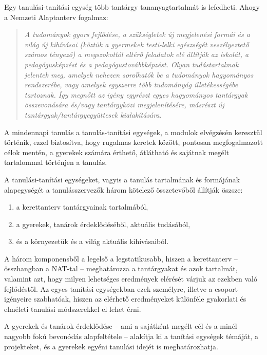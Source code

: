 Egy tanulási-tanítási egység több tantárgy tananyagtartalmát is lefedheti. Ahogy a Nemzeti Alaptanterv fogalmaz:
\begin{quote}
      \textit{A tudományok gyors fejlődése, a szükségletek új megjelenési formái és a világ új kihívásai (köztük a gyermekek testi-lelki egészségét veszélyeztető számos tényező) a megszokottól eltérő feladatok elé állítják az iskolát, a pedagógusképzést és a pedagógustovábbképzést. Olyan tudástartalmak jelentek meg, amelyek nehezen sorolhatók be a tudományok hagyományos rendszerébe, vagy amelyek egyszerre több tudományág illetékességébe tartoznak. Így megnőtt az igény egyrészt egyes hagyományos tantárgyak összevonására és/vagy tantárgyközi megjelenítésére, másrészt új tantárgyak/tantárgyegyüttesek kialakítására.}
\end{quote}

A mindennapi tanulás a tanulás-tanítási egységek, a modulok elvégzésén keresztül történik, ezzel biztosítva, hogy rugalmas keretek között, pontosan megfogalmazott célok mentén, a gyerekek számára érthető, átlátható és sajátnak megélt tartalommal történjen a tanulás.

A tanulási-tanítási egységeket, vagyis a tanulás tartalmának és formájának alapegységét a tanulásszervezők három kötelező összetevőből állítják ösz\-sze:

\begin{enumerate}
      \item
            a kerettanterv tantárgyainak tartalmából,
      \item
            a gyerekek, tanárok érdeklődéséből, aktuális tudásából,
      \item
            és a környezetük és a világ aktuális kihívásaiból.
\end{enumerate}

A három komponensből a legelső a legstatikusabb, hiszen a kerettanterv -- összhangban a NAT-tal -- meghatározza a tantárgyakat és azok tartalmát, valamint azt, hogy milyen lehetséges eredmények elérését várjuk az ezekben való fejlődéstől. Az egyes tanítási egységekban ezek személyre, illetve a csoport igényeire szabhatóak, hiszen az elérhető eredményeket különféle gyakorlati és elméleti tanulási módszerekkel el lehet érni.

A gyerekek és tanárok érdeklődése -- ami a sajátként megélt cél és a minél nagyobb fokú bevonódás alapfeltétele -- alakítja ki a tanítási egységek témáját, a projekteket, és a gyerekek egyéni tanulási idejét is meghatározhatja.

